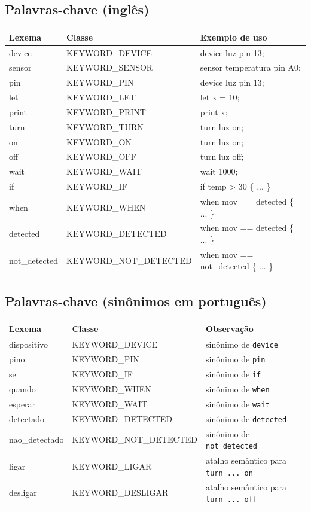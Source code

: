 \documentclass[12pt,a4paper]{article}
\begin{document}
\subsection{Palavras-chave (inglês)}
\begin{longtable}{>{\raggedright\arraybackslash\ttfamily}p{2.8cm} >{\raggedright\arraybackslash\ttfamily}p{5.5cm} >{\raggedright\arraybackslash}p{4.9cm}}
\toprule
\textnormal{Lexema} & \textnormal{Classe} & \textnormal{Exemplo de uso} \\
\midrule
\endhead
device & KEYWORD\_DEVICE & device luz pin 13; \\
sensor & KEYWORD\_SENSOR & sensor temperatura pin A0; \\
pin & KEYWORD\_PIN & device luz pin 13; \\
let & KEYWORD\_LET & let x = 10; \\
print & KEYWORD\_PRINT & print x; \\
turn & KEYWORD\_TURN & turn luz on; \\
on & KEYWORD\_ON & turn luz on; \\
off & KEYWORD\_OFF & turn luz off; \\
wait & KEYWORD\_WAIT & wait 1000; \\
if & KEYWORD\_IF & if temp > 30 \{ ... \} \\
when & KEYWORD\_WHEN & when mov == detected \{ ... \} \\
detected & KEYWORD\_DETECTED & when mov == detected \{ ... \} \\
not\_detected & KEYWORD\_NOT\_DETECTED & when mov == not\_detected \{ ... \} \\
\bottomrule
\end{longtable}

\subsection{Palavras-chave (sinônimos em português)}
\begin{longtable}{>{\raggedright\arraybackslash\ttfamily}p{2.8cm} >{\raggedright\arraybackslash\ttfamily}p{5.5cm} >{\raggedright\arraybackslash}p{4.9cm}}
\toprule
\textnormal{Lexema} & \textnormal{Classe} & \textnormal{Observação} \\
\midrule
\endhead
dispositivo & KEYWORD\_DEVICE & sinônimo de \texttt{device} \\
pino & KEYWORD\_PIN & sinônimo de \texttt{pin} \\
se & KEYWORD\_IF & sinônimo de \texttt{if} \\
quando & KEYWORD\_WHEN & sinônimo de \texttt{when} \\
esperar & KEYWORD\_WAIT & sinônimo de \texttt{wait} \\
detectado & KEYWORD\_DETECTED & sinônimo de \texttt{detected} \\
nao\_detectado & KEYWORD\_NOT\_DETECTED & sinônimo de \texttt{not\_detected} \\
ligar & KEYWORD\_LIGAR & atalho semântico para \texttt{turn ... on} \\
desligar & KEYWORD\_DESLIGAR & atalho semântico para \texttt{turn ... off} \\
\bottomrule
\end{longtable}
\end{document}
